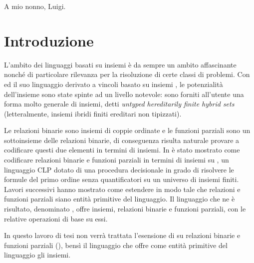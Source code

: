 \documentclass[12pt,a4paper,openright]{book}  %
\newenvironment{dedication}                   %
  {%
   \thispagestyle{empty}%
   \vspace*{\stretch{1}}%
   \itshape             %
   \raggedleft          %
  }
  {\par %
   \vspace{\stretch{3}} %
   \clearpage           %
  }
\begin{document}
\thispagestyle{empty}
\cleardoublepage

\begin{dedication}
A mio nonno, Luigi.
\end{dedication}

\thispagestyle{empty}



\tableofcontents



\chapter{Introduzione}
\resetsecnumdepth

\label{ch:intro}

L'ambito dei linguaggi basati su insiemi è da sempre un ambito
affascinante nonché di particolare rilevanza per la risoluzione di
certe classi di problemi. Con \clpset{} ed il suo linguaggio derivato
a vincoli basato su insiemi \lset{}, le potenzialità dell'insieme sono
state spinte ad un livello notevole: sono forniti all'utente una forma
molto generale di insiemi, detti \textit{untyped hereditarily finite
  hybrid sets} (letteralmente, insiemi ibridi finiti ereditari non
tipizzati).

Le relazioni binarie sono insiemi di coppie ordinate e le funzioni
parziali sono un sottoinsieme delle relazioni binarie, di conseguenza
risulta naturale provare a codificare questi due elementi in termini
di insiemi. In \cite{Rossi18} è stato mostrato come codificare
relazioni binarie e funzioni parziali in termini di insiemi su
\clpset{}, un linguaggio CLP dotato di una procedura decisionale in
grado di risolvere le formule del primo ordine senza quantificatori su
un universo di insiemi finiti. Lavori successivi hanno mostrato come
estendere \clpset{} in modo tale che relazioni e funzioni parziali
siano entità primitive del linguaggio. Il linguaggio che ne è
risultato, denominato \lbr{}, offre insiemi, relazioni binarie e
funzioni parziali, con le relative operazioni di base su essi.

In questo lavoro di tesi non verrà trattata l'esensione di \clpset{}
su relazioni binarie e funzioni parziali (\lbr{}), bensì il linguaggio
\lset{} che offre come entità primitive del linguaggio gli insiemi.
\end{document}

